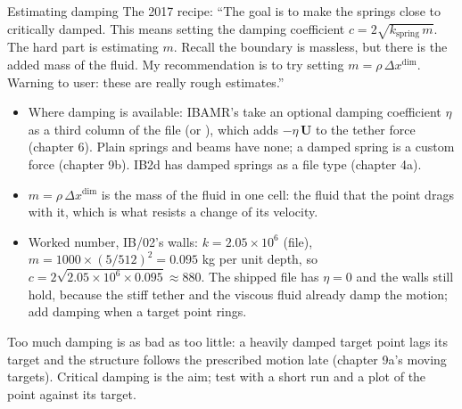 \documentclass[aspectratio=169,11pt]{beamer}
\begin{document}
\begin{frame}{Estimating damping}
\label{fr:damping}
\footnotesize The 2017 recipe: ``The goal is to make the springs close to critically damped. This means setting the damping coefficient $c = 2\sqrt{k_{\mathrm{spring}}\,m}$. The hard part is estimating $m$. Recall the boundary is massless, but there is the added mass of the fluid. My recommendation is to try setting $m = \rho\,\Delta x^{\mathrm{dim}}$. Warning to user: these are really rough estimates.''
\begin{itemize}
  \item Where damping is available: IBAMR's  take an optional damping coefficient $\eta$ as a third column of the  file (or ), which adds $-\eta\,\mathbf{U}$ to the tether force (chapter 6). Plain springs and beams have none; a damped spring is a custom force (chapter 9b). IB2d has damped springs as a file type (chapter 4a).
  \item $m = \rho\,\Delta x^{\mathrm{dim}}$ is the mass of the fluid in one cell: the fluid that the point drags with it, which is what resists a change of its velocity.
  \item Worked number, IB/02's walls: $k = 2.05\times10^6$ (file), $m = 1000 \times (5/512)^2 = 0.095$ kg per unit depth, so $c = 2\sqrt{2.05\times10^6 \times 0.095} \approx 880$. The shipped file has $\eta = 0$ and the walls still hold, because the stiff tether and the viscous fluid already damp the motion; add damping when a target point rings.
\end{itemize}
\begin{punchbox}
\footnotesize Too much damping is as bad as too little: a heavily damped target point lags its target and the structure follows the prescribed motion late (chapter 9a's moving targets). Critical damping is the aim; test with a short run and a plot of the point against its target.
\end{punchbox}
\end{frame}
\end{document}
